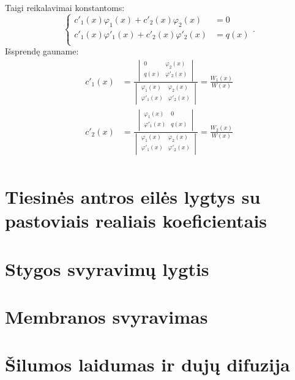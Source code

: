 Taigi reikalavimai konstantoms:
\begin{equation*}
  \left\{%
  \begin{aligned}
    c'_{1}(x)\varphi_{1}(x) + c'_{2}(x)\varphi_{2}(x) &= 0 \\
    c'_{1}(x)\varphi'_{1}(x) + c'_{2}(x)\varphi'_{2}(x) &= q(x) \\
  \end{aligned}.
  \right.
\end{equation*}
Išsprendę gauname:
\begin{align*}
  c'_{1}(x)
  &= \frac{
  \begin{vmatrix}
    0 & \varphi_{2}(x) \\
    q(x) & \varphi'_{2}(x) \\
  \end{vmatrix}
  }{
  \begin{vmatrix}
    \varphi_{1}(x) & \varphi_{2}(x) \\
    \varphi'_{1}(x) & \varphi'_{2}(x) \\
  \end{vmatrix}
  }
  = \frac{W_{1}(x)}{W(x)} \\
  c'_{2}(x)
  &= \frac{
  \begin{vmatrix}
    \varphi_{1}(x) & 0 \\
    \varphi'_{1}(x) & q(x) \\
  \end{vmatrix}
  }{
  \begin{vmatrix}
    \varphi_{1}(x) & \varphi_{2}(x) \\
    \varphi'_{1}(x) & \varphi'_{2}(x) \\
  \end{vmatrix}
  }
  = \frac{W_{2}(x)}{W(x)} \\
\end{align*}

\section{Tiesinės antros eilės lygtys su pastoviais realiais
koeficientais}

\section{Stygos svyravimų lygtis}

\cite[41]{konspektas}

\section{Membranos svyravimas}

\cite[44]{konspektas}

\section{Šilumos laidumas ir dujų difuzija}

\cite[47]{konspektas}
